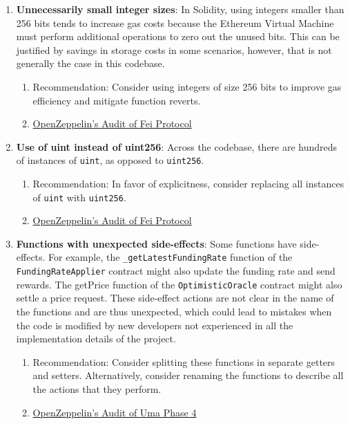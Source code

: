 \begin{enumerate}
\item\textbf{Unnecessarily small integer sizes}: In Solidity, using integers smaller than 256 bits tends to increase gas costs because the Ethereum Virtual Machine must perform additional operations to zero out the unused bits. This can be justified by savings in storage costs in some scenarios, however, that is not generally the case in this codebase.
	\begin{enumerate}
	\item Recommendation: Consider using integers of size 256 bits to improve gas efficiency and mitigate function reverts.
	\item\href{https://blog.openzeppelin.com/fei-protocol-audit/}{OpenZeppelin's Audit of Fei Protocol}
	\end{enumerate}

\item\textbf{Use of uint instead of uint256}: Across the codebase, there are hundreds of instances of \verb|uint|, as opposed to \verb|uint256|.
	\begin{enumerate}
	\item Recommendation: In favor of explicitness, consider replacing all instances of \verb|uint| with \verb|uint256|.
	\item\href{https://blog.openzeppelin.com/fei-protocol-audit/}{OpenZeppelin's Audit of Fei Protocol}
	\end{enumerate}

\item\textbf{Functions with unexpected side-effects}: Some functions have side-effects. For example, the \verb|_getLatestFundingRate| function of the \verb|FundingRateApplier| contract might also update the funding rate and send rewards. The getPrice function of the \verb|OptimisticOracle| contract might also settle a price request. These side-effect actions are not clear in the name of the functions and are thus unexpected, which could lead to mistakes when the code is modified by new developers not experienced in all the implementation details of the project.
	\begin{enumerate}
	\item Recommendation: Consider splitting these functions in separate getters and setters. Alternatively, consider renaming the functions to describe all the actions that they perform.
	\item\href{https://blog.openzeppelin.com/uma-audit-phase-4/}{OpenZeppelin's Audit of Uma Phase 4}
	\end{enumerate}


\end{enumerate}
